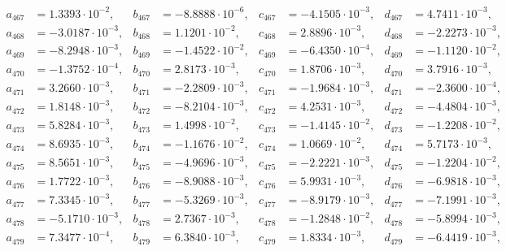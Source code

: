 \begin{align*}
  a_{ 467 } &= 1.3393 \cdot 10^{ -2 }, & b_{ 467 } &= -8.8888 \cdot 10^{ -6 }, & c_{ 467 } &= -4.1505 \cdot 10^{ -3 }, & d_{ 467 } &= 4.7411 \cdot 10^{ -3 }, \\ 
  a_{ 468 } &= -3.0187 \cdot 10^{ -3 }, & b_{ 468 } &= 1.1201 \cdot 10^{ -2 }, & c_{ 468 } &= 2.8896 \cdot 10^{ -3 }, & d_{ 468 } &= -2.2273 \cdot 10^{ -3 }, \\ 
  a_{ 469 } &= -8.2948 \cdot 10^{ -3 }, & b_{ 469 } &= -1.4522 \cdot 10^{ -2 }, & c_{ 469 } &= -6.4350 \cdot 10^{ -4 }, & d_{ 469 } &= -1.1120 \cdot 10^{ -2 }, \\ 
  a_{ 470 } &= -1.3752 \cdot 10^{ -4 }, & b_{ 470 } &= 2.8173 \cdot 10^{ -3 }, & c_{ 470 } &= 1.8706 \cdot 10^{ -3 }, & d_{ 470 } &= 3.7916 \cdot 10^{ -3 }, \\ 
  a_{ 471 } &= 3.2660 \cdot 10^{ -3 }, & b_{ 471 } &= -2.2809 \cdot 10^{ -3 }, & c_{ 471 } &= -1.9684 \cdot 10^{ -3 }, & d_{ 471 } &= -2.3600 \cdot 10^{ -4 }, \\ 
  a_{ 472 } &= 1.8148 \cdot 10^{ -3 }, & b_{ 472 } &= -8.2104 \cdot 10^{ -3 }, & c_{ 472 } &= 4.2531 \cdot 10^{ -3 }, & d_{ 472 } &= -4.4804 \cdot 10^{ -3 }, \\ 
  a_{ 473 } &= 5.8284 \cdot 10^{ -3 }, & b_{ 473 } &= 1.4998 \cdot 10^{ -2 }, & c_{ 473 } &= -1.4145 \cdot 10^{ -2 }, & d_{ 473 } &= -1.2208 \cdot 10^{ -2 }, \\ 
  a_{ 474 } &= 8.6935 \cdot 10^{ -3 }, & b_{ 474 } &= -1.1676 \cdot 10^{ -2 }, & c_{ 474 } &= 1.0669 \cdot 10^{ -2 }, & d_{ 474 } &= 5.7173 \cdot 10^{ -3 }, \\ 
  a_{ 475 } &= 8.5651 \cdot 10^{ -3 }, & b_{ 475 } &= -4.9696 \cdot 10^{ -3 }, & c_{ 475 } &= -2.2221 \cdot 10^{ -3 }, & d_{ 475 } &= -1.2204 \cdot 10^{ -2 }, \\ 
  a_{ 476 } &= 1.7722 \cdot 10^{ -3 }, & b_{ 476 } &= -8.9088 \cdot 10^{ -3 }, & c_{ 476 } &= 5.9931 \cdot 10^{ -3 }, & d_{ 476 } &= -6.9818 \cdot 10^{ -3 }, \\ 
  a_{ 477 } &= 7.3345 \cdot 10^{ -3 }, & b_{ 477 } &= -5.3269 \cdot 10^{ -3 }, & c_{ 477 } &= -8.9179 \cdot 10^{ -3 }, & d_{ 477 } &= -7.1991 \cdot 10^{ -3 }, \\ 
  a_{ 478 } &= -5.1710 \cdot 10^{ -3 }, & b_{ 478 } &= 2.7367 \cdot 10^{ -3 }, & c_{ 478 } &= -1.2848 \cdot 10^{ -2 }, & d_{ 478 } &= -5.8994 \cdot 10^{ -3 }, \\ 
  a_{ 479 } &= 7.3477 \cdot 10^{ -4 }, & b_{ 479 } &= 6.3840 \cdot 10^{ -3 }, & c_{ 479 } &= 1.8334 \cdot 10^{ -3 }, & d_{ 479 } &= -6.4419 \cdot 10^{ -3 }, \\ 

\end{align*}
